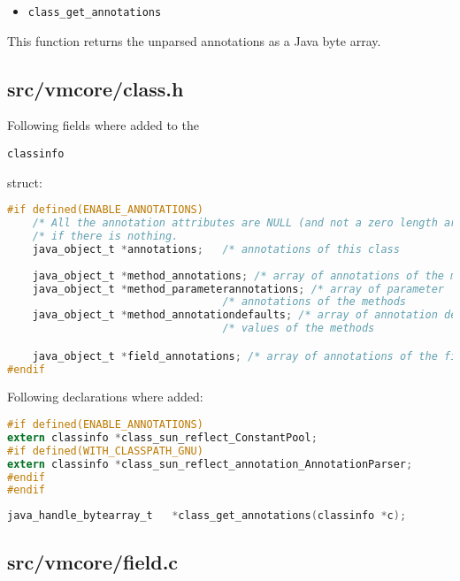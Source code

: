 \documentclass[a4paper, 10pt, titlepage]{scrartcl} %
\begin{document}
\begin{itemize}
 \item \begin{scriptsize}\verb|class_get_annotations|\end{scriptsize}
\end{itemize}
This function returns the unparsed annotations as a Java byte array.

\subsection{src/vmcore/class.h}
\label{sec:src/vmcore/class.h}

Following fields where added to the \begin{scriptsize}\verb|classinfo|\end{scriptsize} struct:
\begin{lstlisting}[language=C,firstnumber=147]
#if defined(ENABLE_ANNOTATIONS)
	/* All the annotation attributes are NULL (and not a zero length array)   */
	/* if there is nothing.                                                   */
	java_object_t *annotations;   /* annotations of this class                */
	
	java_object_t *method_annotations; /* array of annotations of the methods */
	java_object_t *method_parameterannotations; /* array of parameter         */
	                              /* annotations of the methods               */
	java_object_t *method_annotationdefaults; /* array of annotation default  */
	                              /* values of the methods                    */

	java_object_t *field_annotations; /* array of annotations of the fields   */
#endif
\end{lstlisting}

Following declarations where added:
\begin{lstlisting}[language=C,firstnumber=246]
#if defined(ENABLE_ANNOTATIONS)
extern classinfo *class_sun_reflect_ConstantPool;
#if defined(WITH_CLASSPATH_GNU)
extern classinfo *class_sun_reflect_annotation_AnnotationParser;
#endif
#endif
\end{lstlisting}
\begin{lstlisting}[language=C,firstnumber=385]
java_handle_bytearray_t   *class_get_annotations(classinfo *c);
\end{lstlisting}

\subsection{src/vmcore/field.c}
\label{sec:src/vmcore/field.c}
\end{document}
